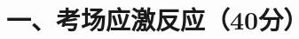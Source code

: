 \documentclass[class=exam-zh, crop]{standalone}
\begin{document}
\section{一、考场应激反应（40分）}
\end{document}
